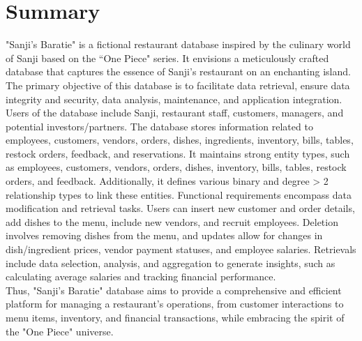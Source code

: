 \section{Summary} \label{cap:summary}
"Sanji's Baratie" is a fictional restaurant database inspired by the culinary world of Sanji based on the “One Piece" series. It envisions a meticulously crafted database that captures the essence of Sanji’s restaurant on an enchanting island. The primary objective of this database is to facilitate data retrieval, ensure data integrity and security, data analysis, maintenance, and application integration. Users of the database include Sanji, restaurant staff, customers, managers, and potential investors/partners. The database stores information related to employees, customers, vendors, orders, dishes, ingredients, inventory, bills, tables, restock orders, feedback, and reservations. It maintains strong entity types, such as employees, customers, vendors, orders, dishes, inventory, bills, tables, restock orders, and feedback. Additionally, it defines various binary and degree > 2 relationship types to link these entities.
Functional requirements encompass data modification and retrieval tasks. Users can insert new customer and order details, add dishes to the menu, include new vendors, and recruit employees. Deletion involves removing dishes from the menu, and updates allow for changes in dish/ingredient prices, vendor payment statuses, and employee salaries. Retrievals include data selection, analysis, and aggregation to generate insights, such as calculating average salaries and tracking financial performance. \\
Thus, "Sanji's Baratie" database aims to provide a comprehensive and efficient platform for managing a restaurant's operations, from customer interactions to menu items, inventory, and financial transactions, while embracing the spirit of the "One Piece" universe.